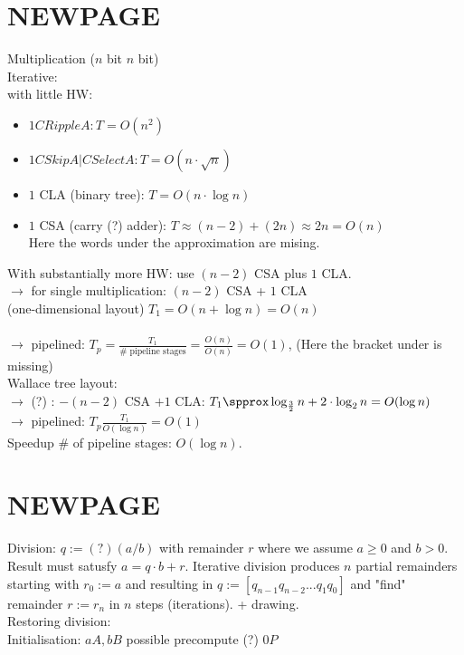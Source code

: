 \section*{NEWPAGE}
Multiplication ($n$ bit \times $n$ bit)\\
Iterative:\\
with little HW: \\
\begin{itemize}
    \item $1 CRippleA: T=O(n^2)$
    \item  $1 CSkipA|CSelectA: T=O(n\cdot \sqrt{n})$
    \item $1$ CLA (binary tree): $T=O(n\cdot \log n)$
    \item $1$ CSA (carry (?) adder): $T\approx (n-2)+(2n)\approx 2n=O(n)$\\
    Here the words under the approximation are mising.
\end{itemize}

With substantially more HW: use $(n-2)$ CSA plus $1$ CLA. \\
$\to$ for single multiplication: $(n-2)$ CSA + $1$ CLA \\
(one-dimensional layout) $T_1=O(n+\log n)=O(n)$\\
\\
$\to$ pipelined:  $T_p=\frac{T_1}{\text{# pipeline stages}}=\frac{O(n)}{O(n)}=O(1)$, (Here the bracket under is missing) \\

Wallace tree layout: \\
$\to$ (?) : $-(n-2)$ CSA $+1$ CLA:  $T_1\spprox \log_{\frac{3}{2}} n+2\cdot \log_{2} n=O(\log n)$ \\
$\to$ pipelined: $T_p\frac{T_1}{O(\log n)}=O(1)$ \\
Speedup \approx # of pipeline stages: $O(\log n)$. \bigskip

\section*{NEWPAGE}
Division: $q:=(?)(a/b)$ with remainder $r$ where we assume $a\ge 0 $ and $b>0$. Result must satusfy $a=q\cdot b+r$. Iterative division produces $n$ partial remainders starting with $r_0:=a$ and resulting in $q:=[q_{n-1}q_{n-2}...q_{1}q_{0}]$ and "find" remainder $r:=r_n$ in $n$ steps (iterations). + drawing. \\

Restoring division: \\
Initialisation: $a$\to$ A, b$\to$ B$ possible precompute (?) $0$\to$ P$ \\

